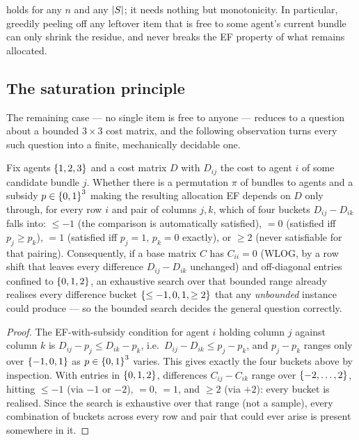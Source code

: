  holds for any $n$ and any $\left\lvert S\right\rvert$; it needs nothing but
monotonicity. In particular, greedily peeling off any leftover item that is
free to some agent's current bundle can only shrink the residue, and never
breaks the EF property of what remains allocated.

\subsection{The saturation principle}

The remaining case --- no single item is free to anyone --- reduces to a
question about a bounded $3\times3$ cost matrix, and the following
observation turns every such question into a finite, mechanically decidable
one.

\begin{lemma}[Saturation]
\label{lem:g-saturation}
Fix agents $\left\{1,2,3\right\}$ and a cost matrix $D$ with $D_{ij}$ the cost to
agent $i$ of some candidate bundle $j$. Whether there is a permutation $\pi$
of bundles to agents and a subsidy $p \in \left\{0,1\right\}^3$ making the
resulting allocation EF depends on $D$ only through, for every row $i$ and
pair of columns $j,k$, which of four buckets $D_{ij}-D_{ik}$ falls into:
$\le -1$ (the comparison is automatically satisfied), $=0$ (satisfied iff
$p_j \ge p_k$), $=1$ (satisfied iff $p_j=1,\,p_k=0$ exactly), or $\ge 2$
(never satisfiable for that pairing). Consequently, if a base matrix $C$ has
$C_{ii}=0$ (WLOG, by a row shift that leaves every difference $D_{ij}-D_{ik}$
unchanged) and off-diagonal entries confined to $\left\{0,1,2\right\}$, an exhaustive
search over that bounded range already realises every difference bucket
$\left\{\le-1,0,1,\ge2\right\}$ that any \emph{unbounded} instance could produce ---
so the bounded search decides the general question correctly.
\end{lemma}
\begin{proof}
The EF-with-subsidy condition for agent $i$ holding column $j$ against column
$k$ is $D_{ij}-p_j \le D_{ik}-p_k$, i.e.\ $D_{ij}-D_{ik} \le p_j - p_k$, and
$p_j-p_k$ ranges only over $\left\{-1,0,1\right\}$ as $p \in \left\{0,1\right\}^3$ varies. This
gives exactly the four buckets above by inspection. With entries in
$\left\{0,1,2\right\}$, differences $C_{ij}-C_{ik}$ range over $\left\{-2,\dots,2\right\}$,
hitting $\le-1$ (via $-1$ or $-2$), $=0$, $=1$, and $\ge2$ (via $+2$): every
bucket is realised. Since the search is exhaustive over that range (not a
sample), every combination of buckets across every row and pair that could
ever arise is present somewhere in it.
\end{proof}

